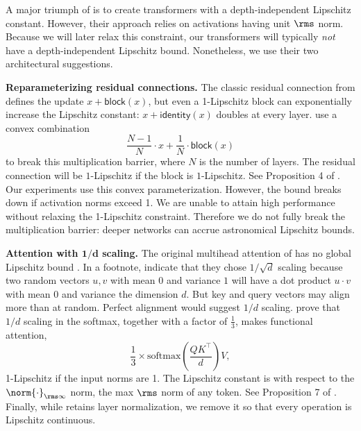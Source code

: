 A major triumph of \citet{large2024} is to create transformers with a depth-independent Lipschitz constant. However, their approach relies on activations having unit $\rms$ norm. Because we will later relax this constraint, our transformers will typically \textit{not} have a depth-independent Lipschitz bound. Nonetheless, we use their two architectural suggestions.

\textbf{Reparameterizing residual connections.} The classic residual connection from \citet{he2015deepresiduallearningimage} defines the update $x + \mathsf{block}(x)$, but even a 1-Lipschitz block can exponentially increase the Lipschitz constant: $x + \mathsf{identity}(x)$ doubles at every layer. \citet{large2024} use a convex combination \begin{equation}
    \label{eq:breaking-barrier-convex-combination}
    \frac{N-1}{N} \cdot x + \frac{1}{N} \cdot\mathsf{block}(x)
\end{equation}to break this multiplication barrier,  where $N$ is the number of layers. The residual connection will be $1$-Lipschitz if the block is $1$-Lipschitz. See Proposition 4 of \citet{large2024}. Our experiments use this convex parameterization. However, the bound breaks down if activation norms exceed 1. We are unable to attain high performance without relaxing the 1-Lipschitz constraint. Therefore we do not fully break the multiplication barrier: deeper networks can accrue astronomical Lipschitz bounds.

\textbf{Attention with $\boldsymbol{1/d}$ scaling.} The original multihead attention of \citet{vaswani2017attention} has no global Lipschitz bound \citep{kim2021lipschitzconstantselfattention}. In a footnote, \citet{vaswani2017attention} indicate that they chose $1/\sqrt{d}$ scaling because two random vectors $u, v$ with mean $0$ and variance $1$ will have a dot product $u \cdot v$ with mean $0$ and variance the dimension $d$. But key and query vectors may align more than at random. Perfect alignment would suggest $1/d$ scaling. \citet{large2024} prove that $1/d$ scaling in the softmax, together with a factor of $\tfrac13$, makes functional attention, \begin{equation}
    \label{eq:breaking-barrier-softmax-1-d}
    \frac13 \times \text{softmax}\left(\frac{QK^\top}{d}\right)V,
\end{equation} 1-Lipschitz if the input norms are 1. The Lipschitz constant is with respect to the $\norm{\cdot}_{\rms\infty}$ norm, the max $\rms$ norm of any token. See Proposition 7 of \citet{large2024}. Finally, while \citet{large2024} retains layer normalization, we remove it so that every operation is Lipschitz continuous.

